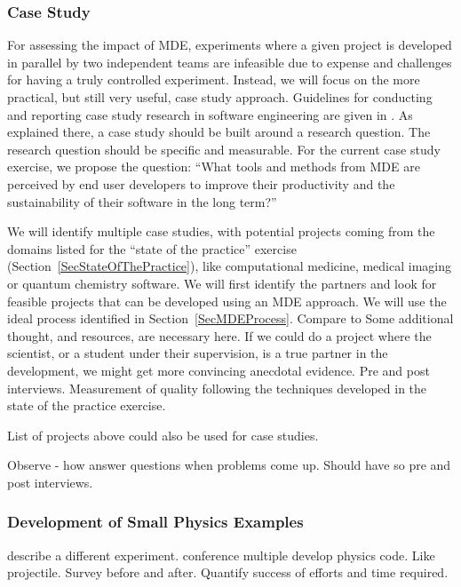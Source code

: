 \documentclass[12pt]{article}
\begin{document}
\subsubsection{Case Study} \label{SecCaseStudy}

For assessing the impact of MDE, experiments where a given project is developed
in parallel by two independent teams are infeasible due to expense and
challenges for having a truly controlled experiment.  Instead, we will focus on
the more practical, but still very useful, case study approach.  Guidelines for
conducting and reporting case study research in software engineering are given
in \citet{RunesonAndHost2009}.  As explained there, a case study should be built
around a research question.  The research question should be specific and
measurable.  For the current case study exercise, we propose the question:
``What tools and methods from MDE are perceived by end user developers to
improve their productivity and the sustainability of their software in the long
term?''

We will identify multiple case studies, with potential projects coming from the
domains listed for the ``state of the practice'' exercise
(Section~\ref{SecStateOfThePractice}), like computational medicine, medical
imaging or quantum chemistry software.  We will first identify the partners and
look for feasible projects that can be developed using an MDE approach.  We will
use the ideal process identified in Section~\ref{SecMDEProcess}.  Compare to Some additional thought, and resources, are necessary
here.  If we could do a project where the scientist, or a student under their
supervision, is a true partner in the development, we might get more convincing
anecdotal evidence.  Pre and post interviews.  Measurement of quality following the
techniques developed in the state of the practice exercise.

List of projects above could also be used for case studies.

Observe - how answer questions when problems come up.  Should have so
pre and post interviews.

\subsubsection{Development of Small Physics
  Examples} \label{SecSmallPhysExample}

describe a different experiment.  conference multiple develop physics code.
Like projectile.  Survey before and after.  Quantify success of efforts and time required.
\end{document}
